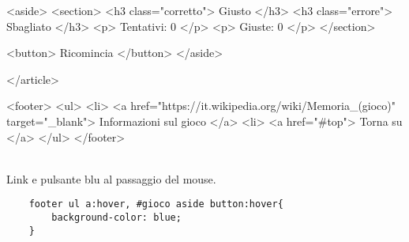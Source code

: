 \begin{frame}[fragile]
\begin{exercise}
{<aside>
    <section>
        <h3 class="corretto"> Giusto </h3>
        <h3 class="errore"> Sbagliato </h3>
        <p> Tentativi: 0 </p>
        <p> Giuste: 0 </p>
    </section>

    <button> Ricomincia </button>
</aside>

</article>

<footer>
    <ul>
        <li> <a href="https://it.wikipedia.org/wiki/Memoria_(gioco)" target="_blank"> Informazioni sul gioco </a>
        <li> <a href="#top"> Torna su </a>
    </ul>
</footer>}\\
Link e pulsante blu al passaggio del mouse.
  \end{exercise}
\end{frame}

\begin{frame}[fragile]\transfade
  \begin{sol}\centering
    \begin{verbatim}
    footer ul a:hover, #gioco aside button:hover{
        background-color: blue;
    }
    \end{verbatim}
  \end{sol}
\end{frame}
